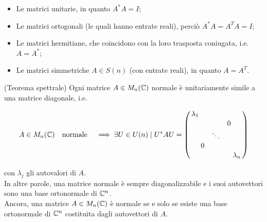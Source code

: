 \begin{itemize}
	\item Le matrici unitarie, in quanto $ A^{*} A = I $;
	
	\item Le matrici ortogonali (le quali hanno entrate reali), perciò $ A^{*} A = A^{T} A = I $;
	
	\item Le matrici hermitiane, che coincidono con la loro trasposta coniugata, i.e. $ A = A^{*} $;
	
	\item Le matrici simmetriche $ A \in S(n) $ (con entrate reali), in quanto $ A = A^{T} $.
\end{itemize}

\begin{theorem}(Teorema spettrale)
	Ogni matrice $ A \in M_{n}(\mathbb{C}) $ normale è unitariamente simile a una matrice diagonale, i.e.
	
	\begin{equation}
		A \in M_{n}(\C) \qq{normale} \implies %
		\exists U \in U(n) \mid U^{*} A U = %
		\smqty(\dmat{\lambda_{1}, & & 0 \\ & \ddots & \\ 0 & & ,\lambda_{n}})
	\end{equation}

	con $ \lambda_{j} $ gli autovalori di $ A $.\\
	In altre parole, una matrice normale è sempre diagonalizzabile e i suoi autovettori sono una base ortonormale di $ \mathbb{C}^{n} $.\\
	Ancora, una matrice $ A \in M_{n}(\mathbb{C}) $ è normale se e solo se esiste una base ortonormale di $ \mathbb{C}^{n} $ costituita dagli autovettori di $ A $.
\end{theorem}

